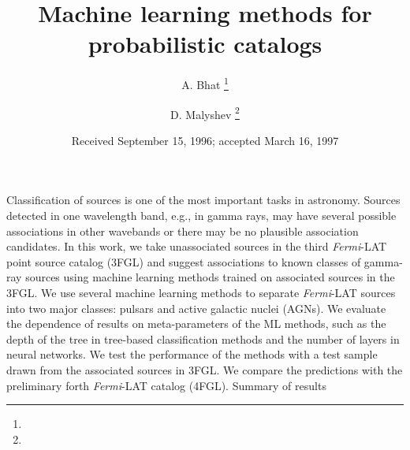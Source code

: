 \documentclass[preprint]{aa}
\newcommand{\Fermi}{\textit{Fermi}\xspace}
\begin{document}
 


   \title{Machine learning methods for probabilistic catalogs}


   \author{A. Bhat \thanks{}
          \and
          D. Malyshev \thanks{}
          }


   \date{Received September 15, 1996; accepted March 16, 1997}

 
\abstract
{
Classification of sources is one of the most important tasks in astronomy.
Sources detected in one wavelength band, e.g., in gamma rays, may have several possible associations in other wavebands or
there may be no plausible association candidates.
}
{
In this work, we take unassociated sources in the third \Fermi-LAT point source catalog (3FGL) and suggest associations
to known classes of gamma-ray sources using machine learning methods trained on associated sources in the 3FGL.
}
{
We use several machine learning methods to separate \Fermi-LAT sources into two major classes: pulsars and active galactic nuclei (AGNs).
We evaluate the dependence of results on meta-parameters of the ML methods, such as the depth of the tree in tree-based classification methods and 
the number of layers in neural networks.
We test the performance of the methods with a test sample drawn from the associated sources in 3FGL.
We compare the predictions with the preliminary forth \Fermi-LAT catalog (4FGL).
}
{
Summary of results
}
{}


\maketitle
   
   
\tableofcontents








\newpage
  

\begin{appendix}


\end{appendix}
\end{document}
